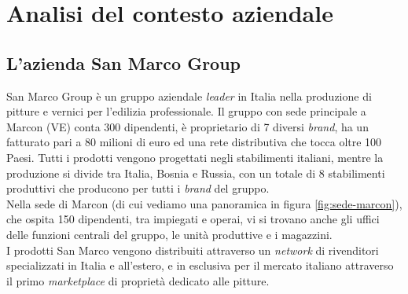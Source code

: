 
\chapter{Analisi del contesto aziendale}
\label{cap:analisi-del-contesto-aziendale}






\section{L'azienda San Marco Group}

San Marco Group è un gruppo aziendale \textit{leader} in Italia nella produzione di pitture e vernici per l'edilizia professionale. Il gruppo con sede principale a Marcon (VE) conta 300 dipendenti, è proprietario di 7 diversi \textit{brand}, ha un fatturato pari a 80 milioni di euro ed una rete distributiva che tocca oltre 100 Paesi. Tutti i prodotti vengono progettati negli stabilimenti italiani, mentre la produzione si divide tra Italia, Bosnia e Russia, con un totale di 8 stabilimenti produttivi che producono per tutti i \textit{brand} del gruppo. \\
Nella sede di Marcon (di cui vediamo una panoramica in figura \ref{fig:sede-marcon}), che ospita 150 dipendenti, tra impiegati e operai, vi si trovano anche gli uffici delle funzioni centrali del gruppo, le unità produttive e i magazzini.\\
I prodotti San Marco vengono distribuiti attraverso un \textit{network} di rivenditori specializzati in Italia e all'estero, e in esclusiva per il mercato italiano attraverso il primo \textit{marketplace} di proprietà dedicato alle pitture.

